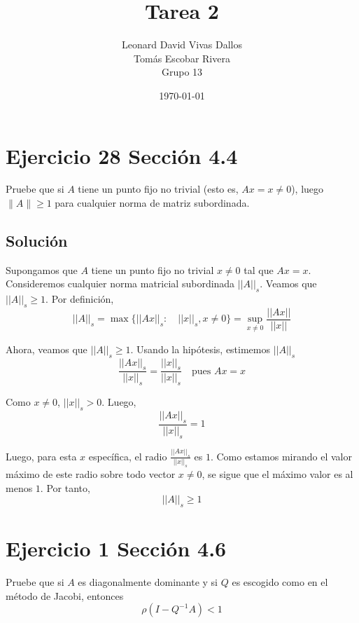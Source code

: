 \documentclass[12pt]{article}
\title{Tarea 2}
\author{Leonard David Vivas Dallos \\ Tomás Escobar Rivera \\ Grupo 13}
\date{\today}
\begin{document}
\maketitle

\tableofcontents

\section{Ejercicio 28 Sección 4.4}

Pruebe que si $A$ tiene un punto fijo no trivial (esto es, $Ax = x \neq 0$), luego $\| A \| \geq 1$ para cualquier norma de matriz subordinada.

\subsection{Solución}

Supongamos que $A$ tiene un punto fijo no trivial $x \neq 0$ tal que $Ax = x$. Consideremos cualquier norma matricial subordinada $||A||_s$. Veamos que $||A||_s \geq 1$. Por definición,
\begin{equation*}
    ||A||_s = \max\{||Ax||_s : \quad ||x||_s, x \neq 0\} = \sup_{x\neq0} \frac{||Ax||}{||x||}
\end{equation*}

Ahora, veamos que $||A||_s \geq 1$. Usando la hipótesis, estimemos $||A||_s$
\begin{equation*}
    \frac{||Ax||_s}{||x||_s} = \frac{||x||_s}{||x||_s} \quad \text{pues } Ax = x
\end{equation*}

Como $x\neq 0$, $||x||_s > 0$. Luego,
\begin{equation*}
    \frac{||Ax||_s}{||x||_s} = 1
\end{equation*}

Luego, para esta $x$ específica, el radio $\frac{||Ax||_s}{||x||_s}$ es $1$. Como estamos mirando el valor máximo de este radio sobre todo vector $x\neq 0$, se sigue que el máximo valor es al menos $1$. Por tanto,
\begin{equation*}
    ||A||_s \geq 1
\end{equation*}

\section{Ejercicio 1 Sección 4.6}

Pruebe que si $A$ es diagonalmente dominante y si $Q$ es escogido como en el método de Jacobi, entonces
\begin{equation*}
    \rho (I - Q^{-1}A) < 1
\end{equation*}
\end{document}
